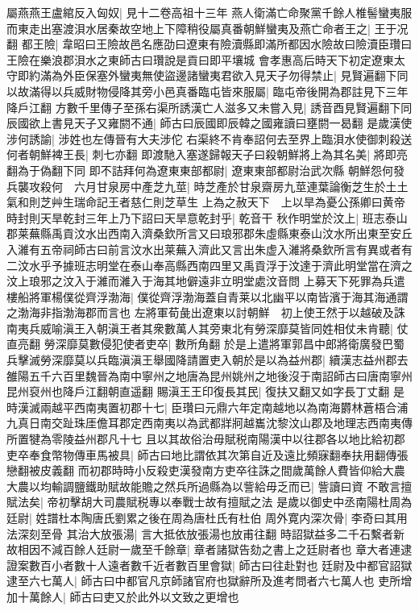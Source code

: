 屬燕燕王盧綰反入匈奴|{
	見十二卷高祖十三年}
燕人衛滿亡命聚黨千餘人椎髻蠻夷服而東走出塞渡浿水居秦故空地上下障稍役屬真番朝鮮蠻夷及燕亡命者王之|{
	王于况翻}
都王險|{
	韋昭曰王險故邑名應劭曰遼東有險瀆縣即滿所都因水險故曰險瀆臣瓚曰王險在樂浪郡浿水之東師古曰瓚說是貢曰即平壤城}
會孝惠高后時天下初定遼東太守即約滿為外臣保塞外蠻夷無使盜邊諸蠻夷君欲入見天子勿得禁止|{
	見賢遍翻下同}
以故滿得以兵威財物侵降其旁小邑真番臨屯皆來服屬|{
	臨屯帝後開為郡註見下三年降戶江翻}
方數千里傳子至孫右渠所誘漢亡人滋多又未嘗入見|{
	誘音酉見賢遍翻下同}
辰國欲上書見天子又雍閼不通|{
	師古曰辰國即辰韓之國雍讀曰壅閼一曷翻}
是歲漢使涉何誘諭|{
	涉姓也左傳晉有大夫涉佗}
右渠終不肯奉詔何去至界上臨浿水使御刺殺送何者朝鮮裨王長|{
	刺七亦翻}
即渡馳入塞遂歸報天子曰殺朝鮮將上為其名美|{
	將即亮翻為于偽翻下同}
即不詰拜何為遼東東部都尉|{
	遼東東部都尉治武次縣}
朝鮮怨何發兵襲攻殺何　六月甘泉房中產芝九莖|{
	時芝產於甘泉齋房九莖連葉論衡芝生於土土氣和則芝艸生瑞命記王者慈仁則芝草生}
上為之赦天下　上以旱為憂公孫卿曰黄帝時封則天旱乾封三年上乃下詔曰天旱意乾封乎|{
	乾音干}
秋作明堂於汶上|{
	班志泰山郡莱蕪縣禹貢汶水出西南入濟桑欽所言又曰琅邪郡朱虛縣東泰山汶水所出東至安丘入濰有五帝祠師古曰前言汶水出莱蕪入濟此又言出朱虚入濰將桑欽所言有異或者有二汶水乎予據班志明堂在泰山奉高縣西南四里又禹貢浮于汶達于濟此明堂當在濟之汶上琅邪之汶入于濰而濰入于海其地僻遠非立明堂處汶音問}
上募天下死罪為兵遣樓船將軍楊僕從齊浮渤海|{
	僕從齊浮渤海蓋自青莱以北幽平以南皆濱于海其海通謂之渤海非指渤海郡而言也}
左將軍荀彘出遼東以討朝鮮　初上使王然于以越破及誅南夷兵威喻滇王入朝滇王者其衆數萬人其旁東北有勞深靡莫皆同姓相仗未肯聽|{
	仗直亮翻}
勞深靡莫數侵犯使者吏卒|{
	數所角翻}
於是上遣將軍郭昌中郎將衛廣發巴蜀兵擊滅勞深靡莫以兵臨滇滇王舉國降請置吏入朝於是以為益州郡|{
	續漢志益州郡去雒陽五千六百里魏晉為南中寧州之地唐為昆州姚州之地後沒于南詔師古曰唐南寧州昆州裒州也降戶江翻朝直遥翻}
賜滇王王印復長其民|{
	復扶又翻又如字長丁丈翻}
是時漢滅兩越平西南夷置初郡十七|{
	臣瓚曰元鼎六年定南越地以為南海欝林蒼梧合浦九真日南交趾珠厓儋耳郡定西南夷以為武都牂牁越巂沈黎汶山郡及地理志西南夷傳所置犍為零陵益州郡凡十七}
且以其故俗治毋賦税南陽漢中以往郡各以地比給初郡吏卒奉食幣物傳車馬被具|{
	師古曰地比謂依其次第自近及遠比頻寐翻奉扶用翻傳張戀翻被皮義翻}
而初郡時時小反殺吏漢發南方吏卒往誅之間歲萬餘人費皆仰給大農大農以均輸調鹽鐵助賦故能贍之然兵所過縣為以訾給毋乏而已|{
	訾讀曰資}
不敢言擅賦法矣|{
	帝初擊胡大司農賦税專以奉戰士故有擅賦之法}
是歲以御史中丞南陽杜周為廷尉|{
	姓譜杜本陶唐氏劉累之後在周為唐杜氏有杜伯}
周外寛内深次骨|{
	李奇曰其用法深刻至骨}
其治大放張湯|{
	言大抵依放張湯也放甫往翻}
時詔獄益多二千石繫者新故相因不減百餘人廷尉一歲至千餘章|{
	章者諸獄告劾之書上之廷尉者也}
章大者連逮證案數百小者數十人遠者數千近者數百里會獄|{
	師古曰往赴對也}
廷尉及中都官詔獄逮至六七萬人|{
	師古曰中都官凡京師諸官府也獄辭所及進考問者六七萬人也}
吏所增加十萬餘人|{
	師古曰吏又於此外以文致之更增也}


